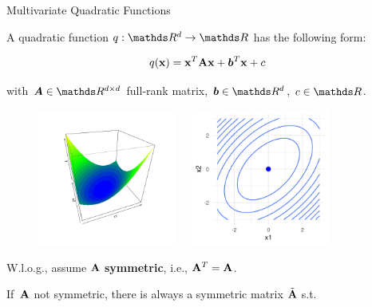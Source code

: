 \documentclass[11pt,compress,t,notes=noshow, xcolor=table]{beamer}
\begin{document}
\begin{vbframe}{Multivariate Quadratic Functions}

A quadratic function $q: \R^d \to \R$ has the following form: 

\begin{equation*}
    q(\mathbf{x}) = \mathbf{x}^T \mathbf{A} \mathbf{x} + \bm{b}^T \mathbf{x} + c
\end{equation*}

with $\bm{A} \in \R^{d \times d}$ full-rank matrix, $\bm{b} \in \R^d$, $c \in \R$. %

\vspace{0.5\baselineskip}

\begin{figure}
    \includegraphics[height=0.4\textwidth,width=0.4\textwidth]{figure_man/quadratic_functions_2D_example_1_1.png} ~~ \includegraphics[height=0.4\textwidth,width=0.4\textwidth]{figure_man/quadratic_functions_2D_example_1_2.png} \\
\end{figure}

\framebreak

W.l.o.g., assume $\mathbf{A}$ \textbf{symmetric}, i.e., $\mathbf{A}^T = \mathbf{A}$.

\vspace{0.5\baselineskip}

If~$\mathbf{A}$ not symmetric, there is always a symmetric matrix $\tilde {\mathbf{A}}$ s.t. 


\end{vbframe}
\end{document}
